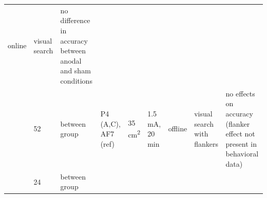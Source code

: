 \documentclass[11pt,english,]{memoir}
\begin{document}
\begin{longtable}[]{@{}lllllllll@{}}
\begin{minipage}[t]{0.05\columnwidth}
online\strut
\end{minipage} & \begin{minipage}[t]{0.06\columnwidth}\raggedright
visual
search\strut
\end{minipage} & \begin{minipage}[t]{0.25\columnwidth}\raggedright
no difference in accuracy between anodal and sham
conditions\strut
\end{minipage}\tabularnewline
\begin{minipage}[t]{0.08\columnwidth}\raggedright
\textcite{Kajimura2016}\strut
\end{minipage} & \begin{minipage}[t]{0.03\columnwidth}\raggedright
52\strut
\end{minipage} & \begin{minipage}[t]{0.05\columnwidth}\raggedright
between
group\strut
\end{minipage} & \begin{minipage}[t]{0.15\columnwidth}\raggedright
P4 (A,C), AF7 (ref)\strut
\end{minipage} & \begin{minipage}[t]{0.04\columnwidth}\raggedright
35
cm\textsuperscript{2}\strut
\end{minipage} & \begin{minipage}[t]{0.06\columnwidth}\raggedright
1.5 mA, 20
min\strut
\end{minipage} & \begin{minipage}[t]{0.05\columnwidth}\raggedright
offline\strut
\end{minipage} & \begin{minipage}[t]{0.06\columnwidth}\raggedright
visual
search
with
flankers\strut
\end{minipage} & \begin{minipage}[t]{0.25\columnwidth}\raggedright
no effects on accuracy (flanker effect not present
in behavioral data)\strut
\end{minipage}\tabularnewline
\begin{minipage}[t]{0.08\columnwidth}\raggedright
\textcite{Muller2015}\strut
\end{minipage} & \begin{minipage}[t]{0.03\columnwidth}\raggedright
24\strut
\end{minipage} & \begin{minipage}[t]{0.05\columnwidth}\raggedright
between
group\strut
\end{minipage} & \begin{minipage}[t]{0.15\columnwidth}\raggedright

\end{minipage}
\end{longtable}
\end{document}
